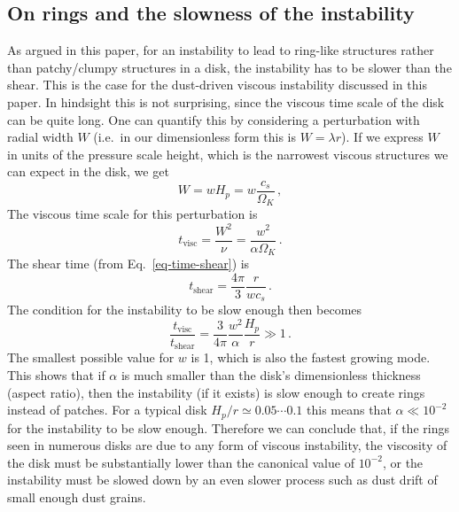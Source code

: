 \documentclass{aa}
\def\comma{\,,}
\def\fullstop{\,.}
\newcommand{\revised}[1]{{#1}}
\begin{document}
\subsection{On rings and the slowness of the instability}
\revised{As argued in this paper, for an instability to lead to ring-like structures
rather than patchy/clumpy structures in a disk, the instability has to be slower
than the shear. This is the case for the dust-driven viscous instability discussed
in this paper. In hindsight this is not surprising, since the viscous time scale
of the disk can be quite long. One can quantify this by considering a perturbation with
radial width $W$ (i.e.~in our dimensionless form this is $W=\lambda r$). If
we express $W$ in units of the pressure scale height, which is the narrowest
viscous structures we can expect in the disk, we get}
\begin{equation}
W=w H_p = w\frac{c_s}{\Omega_K}\comma
\end{equation}
\revised{The viscous time scale for this perturbation is}
\begin{equation}
t_{\mathrm{visc}}=\frac{W^2}{\nu} = \frac{w^2}{\alpha\Omega_K}\fullstop
\end{equation}
\revised{The shear time (from Eq.~\ref{eq-time-shear}) is}
\begin{equation}
t_{\mathrm{shear}} = \frac{4\pi}{3}\frac{r}{wc_s}\fullstop
\end{equation}
\revised{The condition for the instability to be slow enough then becomes}
\begin{equation}
\frac{t_{\mathrm{visc}}}{t_{\mathrm{shear}}} = \frac{3}{4\pi}\frac{w^2}{\alpha}\frac{H_p}{r}\gg 1\fullstop
\end{equation}
\revised{The smallest possible value for $w$ is 1, which is also the fastest
  growing mode. This shows that if $\alpha$ is much smaller than the disk's
  dimensionless thickness (aspect ratio), then the instability (if it exists) is
  slow enough to create rings instead of patches. For a typical disk
  $H_p/r\simeq 0.05\cdots 0.1$ this means that $\alpha\ll 10^{-2}$ for the
  instability to be slow enough.  Therefore we can conclude that, if the rings
  seen in numerous disks are due to any form of viscous instability, the
  viscosity of the disk must be substantially lower than the canonical value of
  $10^{-2}$, or the instability must be slowed down by an even slower process
  such as dust drift of small enough dust grains.}
\end{document}
